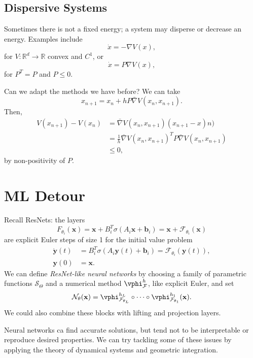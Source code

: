 \documentclass[12pt]{article}
\begin{document}
\subsection{Dispersive Systems}%
\label{sub:ds}

Sometimes there is not a fixed energy; a system may disperse or decrease an energy. Examples include
\[
\dot x = - \nabla V(x),
\]
for $V : \mathbb{R}^{d} \to \mathbb{R}$ convex and $C^{1}$, or
\[
\dot x = P \nabla V(x),
\]
for $P^{T} = P$ and $P \leq 0$.

Can we adapt the methods we have before? We can take
\[
x_{n+1} = x_n + h P \bar \nabla V(x_n, x_{n+1}).
\]
Then,
\begin{align*}
	V(x_{n+1}) - V(x_n) &= \bar \nabla V(x_n, x_{n+1}) (x_{n+1} - x)n) \\
			    &= \frac{1}{h} \bar \nabla V(x_n, x_{n+1})^{T} P \bar \nabla V(x_n, x_{n+1}) \\
			    & \leq 0,
\end{align*}
by non-positivity of $P$.


\newpage

\section{ML Detour}%
\label{sec:mld}

Recall ResNets: the layers
\[
F_{\theta_i}(\mathbf{x}) = \mathbf{x} + B_i^{T} \sigma(A_i \mathbf{x} + \mathbf{b}_i) = \mathbf{x} + \mathcal{F}_{\theta_i}(\mathbf{x})
\]
are explicit Euler steps of size 1 for the initial value problem
\begin{align*}
	\mathbf{\dot y}(t) &= B_i^{T} \sigma(A_i \mathbf{y}(t) + \mathbf{b}_i) = \mathcal{F}_{\theta_i}(\mathbf{y}(t)), \\
	\mathbf{y}(0) &= \mathbf{x}.
\end{align*}
We can define \emph{ResNet-like neural networks} by choosing a family of parametric functions $\mathcal{S}_{\Theta}$ and a numerical method $\vphi_{\mathcal{F}}^{h}$, like explicit Euler, and set
\[
\mathcal{N}_{\theta}(\mathbf{x}) = \vphi_{\mathcal{F}_{\theta_L}}^{h_L} \circ \cdots \circ \vphi_{\mathcal{F}_{\theta_1}}^{h_1}(\mathbf{x}).
\]
We could also combine these blocks with lifting and projection layers.

Neural networks ca find accurate solutions, but tend not to be interpretable or reproduce desired properties. We can try tackling some of these issues by applying the theory of dynamical systems and geometric integration.
\end{document}
